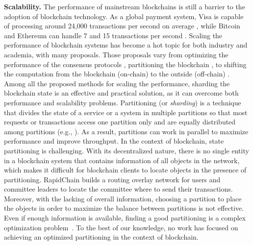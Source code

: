 \textbf{Scalability.} The performance of mainstream blockchains is still a
barrier to the adoption of blockchain technology. As a global payment system,
Visa is capable of processing around 24,000 transactions per second on average
\cite{visa}, while Bitcoin and Ethereum can handle 7 and 15 transactions per
second \cite{ethereum:sharding, nakamoto2019bitcoin}. Scaling the performance of
blockchain systems has become a hot topic for both industry and academia, with
many proposals. Those proposals vary from optimizing the performance of the
consensus protocols \cite{dang2019towards}, partitioning the blockchain
\cite{wang2019sok}, to shifting the computation from the blockchain (on-chain)
to the outside (off-chain) \cite{teutsch2019scalable, network2018cheap}. Among
all the proposed methods for scaling the performance, sharding the blockchain state
is an effective and practical solution, as it can overcome both performance and
scalability problems. Partitioning (or \emph{sharding}) is a
technique that divides the state of a service or a system in multiple partitions
so that most requests or transactions access one partition only and are equally
distributed among partitions (e.g., \cite{facebookTAO, sciascia2012sdur,
aguilera2007sinfonia}). As a result, partitions can work in parallel to maximize
performance and improve throughput. In the context of blockchain, state
partitioning is challenging.
With its decentralized nature, there is no single entity in a blockchain system that
contains information of all objects in the network, which makes it difficult for
blockchain clients to locate objects in the presence of partitioning. RapidChain
\cite{zamani2018rapidchain} builds a routing overlay network for users and
committee leaders to locate the committee where to send their transactions.
Moreover, with the lacking of overall information, choosing a partition to place
the objects in order to maximize the balance between partitions is not
effective. Even if enough information is available, finding a good partitioning
is a complex optimization problem~\cite{curino2010sch,taft2014est}. To the best
of our knowledge, no work has focused on achieving an optimized partitioning in the
context of blockchain.

